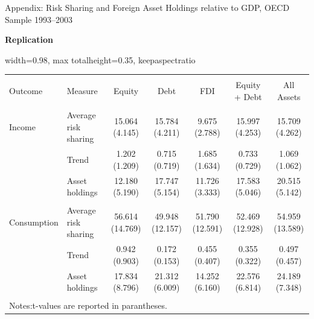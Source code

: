 \documentclass[aspectratio=169, 10pt]{beamer}
\begin{document}
\begin{frame}[t]{Appendix: Risk Sharing and Foreign Asset Holdings relative to GDP, OECD Sample 1993--2003}
  \vspace{0.18cm}
  
  {\scriptsize \textbf{Replication}}
  
  \vspace{0.04cm}
  
  \begin{adjustbox}{
    width=0.98\textwidth,
    max totalheight=0.35\textheight,
    keepaspectratio
  }
  \begin{tabular}{@{\extracolsep{3pt}}llccccc}
  \\[-1.8ex]\hline
  \hline \\[-1.8ex]
  Outcome 
  & Measure
  & Equity 
  & Debt 
  & FDI 
  & Equity + Debt 
  & All Assets \\
  \hline \\[-1.8ex]
  
  Income 
  & Average risk sharing 
  & 15.064 (4.145)
  & 15.784 (4.211)
  & 9.675 (2.788)
  & 15.997 (4.253)
  & 15.709 (4.262) \\
  
  & Trend 
  & 1.202 (1.209)
  & 0.715 (0.719)
  & 1.685 (1.634)
  & 0.733 (0.729)
  & 1.069 (1.062) \\
  
  & Asset holdings 
  & 12.180 (5.190)
  & 17.747 (5.154)
  & 11.726 (3.333)
  & 17.583 (5.046)
  & 20.515 (5.142) \\
  
  \hline \\[-1.8ex]
  
  Consumption 
  & Average risk sharing 
  & 56.614 (14.769)
  & 49.948 (12.157)
  & 51.790 (12.591)
  & 52.469 (12.928)
  & 54.959 (13.589) \\
  
  & Trend 
  & 0.942 (0.903)
  & 0.172 (0.153)
  & 0.455 (0.407)
  & 0.355 (0.322)
  & 0.497 (0.457) \\
  
  & Asset holdings 
  & 17.834 (8.796)
  & 21.312 (6.009)
  & 14.252 (6.160)
  & 22.576 (6.814)
  & 24.189 (7.348) \\
  
  \hline \\[-1.8ex]
  \multicolumn{7}{l}{\footnotesize Notes:t-values are reported in parantheses.} \\
  \end{tabular}
  \end{adjustbox}
  
  \endgroup
  
  \end{frame}
\end{document}
